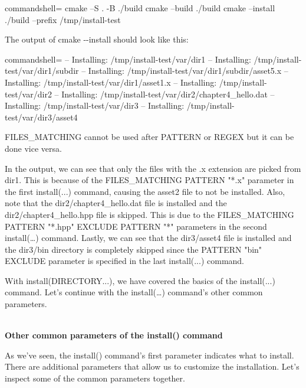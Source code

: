 \begin{tcblisting}{commandshell={}}
cmake –S . -B ./build
cmake –build ./build
cmake –install ./build –prefix /tmp/install-test
\end{tcblisting}

The output of cmake -{}-install should look like this:

\begin{tcblisting}{commandshell={}}
-- Installing: /tmp/install-test/var/dir1
-- Installing: /tmp/install-test/var/dir1/subdir
-- Installing: /tmp/install-test/var/dir1/subdir/asset5.x
-- Installing: /tmp/install-test/var/dir1/asset1.x
-- Installing: /tmp/install-test/var/dir2
-- Installing: /tmp/install-test/var/dir2/chapter4_hello.dat
-- Installing: /tmp/install-test/var/dir3
-- Installing: /tmp/install-test/var/dir3/asset4
\end{tcblisting}

\begin{tcolorbox}[colback=webgreen!5!white,colframe=webgreen!75!black,title=Note]
FILES\_MATCHING cannot be used after PATTERN or REGEX but it can be done vice versa.
\end{tcolorbox}

In the output, we can see that only the files with the .x extension are picked from dir1. This is because of the FILES\_MATCHING PATTERN "*.x" parameter in the first install(...) command, causing the asset2 file to not be installed. Also, note that the dir2/chapter4\_hello.dat file is installed and the dir2/chapter4\_hello.hpp file is skipped. This is due to the FILES\_MATCHING PATTERN "*.hpp" EXCLUDE PATTERN "*" parameters in the second install(…) command. Lastly, we can see that the dir3/asset4 file is installed and the dir3/bin directory is completely skipped since the PATTERN "bin" EXCLUDE parameter is specified in the last install(...) command.

With install(DIRECTORY...), we have covered the basics of the install(...) command. Let's continue with the install(…) command's other common parameters.

\hspace*{\fill} \\ %
\noindent
\textbf{Other common parameters of the install() command}

As we've seen, the install() command's first parameter indicates what to install. There are additional parameters that allow us to customize the installation. Let's inspect some of the common parameters together.

